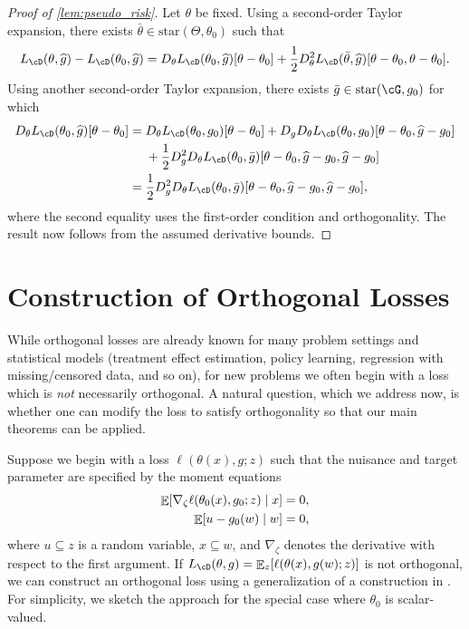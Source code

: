\documentclass[11pt]{article} %
\newcommand{\pref}[1]{\cref{#1}}
\newcommand{\pfref}[1]{Proof of \pref{#1}}
\theoremstyle{theorem}  %
\theoremstyle{plain}
\DeclarePairedDelimiter{\brk}{[}{]}
\DeclareMathOperator{\En}{\mathbb{E}}
\newcommand{\ls}{\ell}
\newcommand{\wh}[1]{\widehat{#1}}
\newcommand{\grad}{\nabla}
\newcommand{\poprisk}{L_{\cD}}
\newcommand{\starhull}{\mathrm{star}}
\newcommand{\estone}{\wh{g}}
\newcommand{\nuisance}{\cG}
\newcommand{\target}{\Theta}
\newcommand{\gtone}{g_0}
\newcommand{\gttwo}{\theta_0}
\begin{document}
\begin{proof}[\pfref{lem:pseudo_risk}]
Let $\theta$ be fixed. Using a second-order Taylor expansion, there exists $\bar{\theta}\in\starhull(\target,\gttwo)$ such that
\begin{align*}
  \poprisk(\theta,\estone) - \poprisk(\gttwo,\estone)
  =
D_{\theta}\poprisk(\gttwo,\estone)[\theta-\gttwo] + \frac{1}{2}D^{2}_{\theta}\poprisk(\bar{\theta},\estone)[\theta-\gttwo,\theta-\gttwo].
\end{align*}
Using another second-order Taylor expansion, there exists $\bar{g}\in\starhull(\nuisance,\gtone)$ for which
\begin{align*}
D_{\theta}\poprisk(\gttwo,\estone)[\theta-\gttwo]
&= D_{\theta}\poprisk(\gttwo,\gtone)[\theta-\gttwo]
+ D_{g}D_{\theta}\poprisk(\gttwo,\gtone)[\theta-\gttwo,\estone-\gtone]\\
  &~~~~+ \frac{1}{2}D^{2}_{g}D_{\theta}\poprisk(\gttwo,\bar{g})[\theta-\gttwo,\estone-\gtone,\estone-\gtone]\\
  &=\frac{1}{2}D^{2}_{g}D_{\theta}\poprisk(\gttwo,\bar{g})[\theta-\gttwo,\estone-\gtone,\estone-\gtone],
\end{align*}
where the second equality uses the first-order condition and orthogonality. The result now follows from the assumed derivative bounds.
  
\end{proof}

%
%
%
%
 
\section{Construction of Orthogonal Losses}
\label{sec:orthogonal_loss}
%
%

While orthogonal losses are already known for many problem settings
and statistical models (treatment effect estimation, policy learning,
regression with missing/censored data, and so on), for new
problems we often begin with a loss which is \emph{not} necessarily
orthogonal. A natural question, which we address now, is whether one
can modify the loss to satisfy orthogonality so that our main theorems
can be applied.

Suppose we begin with a loss $\ls(\theta(x),g;z)$ such that the
nuisance and target parameter are specified by the moment equations
\begin{equation}
  \label{eq:non_orthogonal_moment}
  \begin{aligned}
    \En\brk*{\grad_{\zeta}\ls(\gttwo(x),\gtone;z)\mid{}x}=0,\\
    \En\brk*{u - \gtone(w)\mid{}w} = 0,
  \end{aligned}
\end{equation}
where $u\subseteq{}z$ is a random variable, $x\subseteq{} w$, and $\grad_{\zeta}$
denotes the derivative with respect to the first
argument. If $\poprisk(\theta,g)=\En_{z}\brk*{\ls(\theta(x),g(w);z)}$
is not orthogonal, we can construct an orthogonal loss using a generalization of a construction in
\cite{chernozhukov2018plugin}. For simplicity, we sketch the approach
for the special case where $\gttwo$ is scalar-valued.
\end{document}
